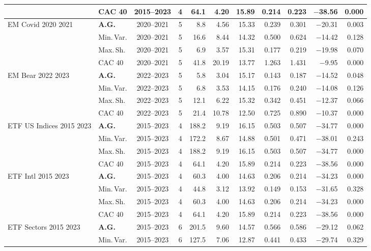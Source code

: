 \begin{longtable}{p{2.6cm} l c c r r r r r r r}
 & CAC 40 & 2015--2023 & 4 & 64.1 & 4.20 & 15.89 & 0.214 & 0.223 & $-$38.56 & 0.000 \\
\midrule
EM Covid 2020 2021 & \textbf{A.G.} & 2020--2021 & 5 & 8.8 & 4.56 & 15.33 & 0.239 & 0.301 & $-$20.31 & 0.003 \\
 & Min.\,Var. & 2020--2021 & 5 & 16.6 & 8.44 & 14.32 & 0.500 & 0.624 & $-$14.42 & 0.128 \\
 & Max.\,Sh. & 2020--2021 & 5 & 6.9 & 3.57 & 15.31 & 0.177 & 0.219 & $-$19.98 & 0.070 \\
 & CAC 40 & 2020--2021 & 5 & 41.8 & 20.19 & 13.77 & 1.263 & 1.431 & $-$9.95 & 0.000 \\
\midrule
EM Bear 2022 2023 & \textbf{A.G.} & 2022--2023 & 5 & 5.8 & 3.04 & 15.17 & 0.143 & 0.187 & $-$14.52 & 0.048 \\
 & Min.\,Var. & 2022--2023 & 5 & 6.8 & 3.53 & 14.15 & 0.176 & 0.240 & $-$14.08 & 0.126 \\
 & Max.\,Sh. & 2022--2023 & 5 & 12.1 & 6.22 & 15.32 & 0.342 & 0.451 & $-$12.37 & 0.066 \\
 & CAC 40 & 2022--2023 & 5 & 21.4 & 10.78 & 12.50 & 0.725 & 0.890 & $-$10.37 & 0.000 \\
\midrule
ETF US Indices 2015 2023 & \textbf{A.G.} & 2015--2023 & 4 & 188.2 & 9.19 & 16.15 & 0.503 & 0.507 & $-$34.77 & 0.000 \\
 & Min.\,Var. & 2015--2023 & 4 & 172.2 & 8.67 & 14.88 & 0.501 & 0.471 & $-$38.01 & 0.243 \\
 & Max.\,Sh. & 2015--2023 & 4 & 188.2 & 9.19 & 16.15 & 0.503 & 0.507 & $-$34.77 & 0.000 \\
 & CAC 40 & 2015--2023 & 4 & 64.1 & 4.20 & 15.89 & 0.214 & 0.223 & $-$38.56 & 0.000 \\
\midrule
ETF Intl 2015 2023 & \textbf{A.G.} & 2015--2023 & 4 & 60.3 & 4.00 & 14.63 & 0.206 & 0.214 & $-$34.23 & 0.000 \\
 & Min.\,Var. & 2015--2023 & 4 & 44.8 & 3.12 & 13.92 & 0.149 & 0.153 & $-$31.65 & 0.328 \\
 & Max.\,Sh. & 2015--2023 & 4 & 60.3 & 4.00 & 14.63 & 0.206 & 0.214 & $-$34.23 & 0.000 \\
 & CAC 40 & 2015--2023 & 4 & 64.1 & 4.20 & 15.89 & 0.214 & 0.223 & $-$38.56 & 0.000 \\
\midrule
ETF Sectors 2015 2023 & \textbf{A.G.} & 2015--2023 & 6 & 201.5 & 9.60 & 14.57 & 0.566 & 0.586 & $-$29.12 & 0.062 \\
 & Min.\,Var. & 2015--2023 & 6 & 127.5 & 7.06 & 12.87 & 0.441 & 0.433 & $-$29.74 & 0.329 \\

\end{longtable}
